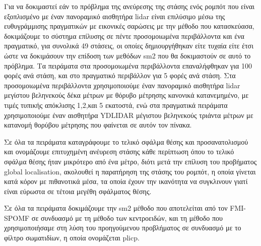 \documentclass[a4paper,10pt]{article}
\begin{document}
Για να δοκιμαστεί εάν το πρόβλημα της ανεύρεσης της στάσης ενός ρομπότ που
είναι εξοπλισμένο με έναν πανοραμικό αισθητήρα lidar είναι επιλύσιμο μέσω της
ευθυγράμμισης πραγματικών με εικονικές σαρώσεις με την μέθοδο που κατασκεύασα,
δοκιμάζουμε το σύστημα επίλυσης σε πέντε προσομοιωμένα περιβάλλοντα και ένα
πραγματικό, για συνολικά 49 στάσεις, οι οποίες δημιουργήθηκαν είτε τυχαία είτε
έτσι ώστε να δοκιμάσουν την επίδοση των μεθόδων sm2 που θα δοκιμαστούν σε αυτό
το πρόβλημα. Τα πειράματα στα προσομοιωμένα περιβάλλοντα επαναλήφθηκαν για 100
φορές ανά στάση, και στο πραγματικό περιβάλλον για 5 φορές ανά στάση.  Στα
προσομοιωμένα περιβάλλοντα χρησιμοποιούμε έναν πανοραμικό αισθητήρα lidar
μεγίστου βεληνεκούς δέκα μέτρων με θόρυβο μέτρησης κανονικά κατανεμημένο, με
τιμές τυπικής απόκλισης 1,2,και 5 εκατοστά, ενώ στα πραγματικά πειράματα
χρησιμοποιούμε έναν αισθητήρα YDLIDAR μέγιστου βεληνεκούς τριάντα μέτρων με
κατανομή θορύβου μέτρησης που φαίνεται σε αυτόν τον πίνακα.

Σε όλα τα πειράματα καταγράφουμε το τελικό σφάλμα θέσης και προσανατολισμού και
ονομάζουμε επιτυχημένη ανέυρεση στάσης κάθε περίπτωση όπου το τελικό σφάλμα
θέσης ήταν μικρότερο από ένα μέτρο, διότι μετά την επίλυση του προβήματος
global localisation, ακολουθεί η παρατήρηση της στάσης του ρομπότ, η οποία
γίνεται κατά κόρον με πιθανοτικά μέσα, τα οποία έχουν την ικανότητα να
συγκλινουν γιατί είναι εύρωστα σε τέτοια μεγέθη σφάλματος θέσης.

Σε όλα τα πειράματα δοκιμάζουμε την sm2 μέθοδο που αποτελείται από τον FMI-SPOMF
σε συνδυασμό με τη μέθοδο των κεντροειδών, και τη μέθοδο που χρησιμοποιήσαμε
στη λύση του προηγούμενου προβλήματος σε συνδυασμό με το φίλτρο σωματιδίων, η
οποία ονομάζεται plicp.
\end{document}
